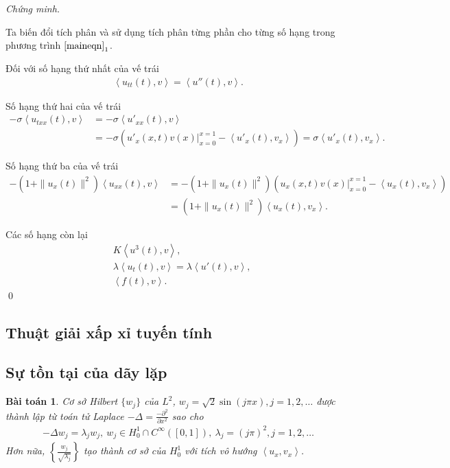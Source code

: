 \documentclass[12pt,a4paper]{article}
\newtheorem{theorem}{Bài toán}[section]
\theoremstyle{definition}
\begin{document}
\textit{Chứng minh.}

Ta biến đổi tích phân và sử dụng tích phân từng phần cho từng số hạng trong phương trình $\eqref{maineqn}_1$.

Đối với số hạng thứ nhất của vế trái
\begin{align*}
    \left<u_{tt}(t), v\right> = \left<u''(t), v\right>.
\end{align*}

Số hạng thứ hai của vế trái
\begin{align*}
    -\sigma \left<u_{txx}(t), v\right>
    &= -\sigma \left<u'_{xx}(t), v\right> \\
    &= -\sigma \left(\left.u'_x(x,t) v(x)\right|_{x=0}^{x=1} - \left<u'_x(t),v_x\right> \right)
    = \sigma \left<u'_x(t), v_x\right>.
\end{align*}

Số hạng thứ ba của vế trái
\begin{align*}
    -\left(1 + \|u_x(t)\|^2\right)\left<u_{xx}(t),v\right>
    &= -\left(1 + \|u_x(t)\|^2\right)\left(\left.u_x(x,t)v(x)\right|_{x=0}^{x=1} - \left<u_x(t),v_x\right>\right) \\
    &= \left(1 + \|u_x(t)\|^2\right) \left<u_x(t),v_x\right>.
\end{align*}

Các số hạng còn lại
\begin{align*}
    &K\left<u^3(t),v\right>, \\
    &\lambda \left<u_t(t),v\right> = \lambda \left<u'(t),v\right>, \\
    &\left<f(t),v\right>.
\end{align*} \qed

\subsection{Thuật giải xấp xỉ tuyến tính}
\subsection{Sự tồn tại của dãy lặp}

\begin{theorem}
    Cơ sở Hilbert $\{w_j\}$ của $L^2$, $w_j = \sqrt{2} \sin(j\pi x), j = 1,2,\dots$ được thành lập từ toán tử Laplace $-\Delta = \frac{-\partial^2}{\partial x^2}$ sao cho
    \begin{align*}
        -\Delta w_j = \lambda_j w_j, \: w_j \in H^1_0 \cap C^\infty([0,1]), \: \lambda_j = (j\pi)^2, j=1,2,\dots
    \end{align*}
    Hơn nữa, $\left\{\frac{w_j}{\sqrt{\lambda_j}}\right\}$ tạo thành cơ sở của $H^1_0$ với tích vô hướng $\left<u_x, v_x\right>$.
\end{theorem}
\end{document}
